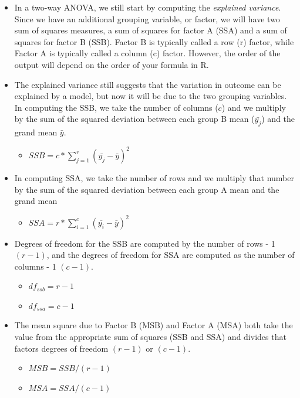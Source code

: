 \documentclass[
  letterpaper,
  DIV=11,
  numbers=noendperiod]{scrreprt}
\providecommand{\tightlist}{%
  \setlength{\itemsep}{0pt}\setlength{\parskip}{0pt}}\usepackage{longtable,booktabs,array}
\begin{document}
\begin{itemize}
\item
  In a two-way ANOVA, we still start by computing the \emph{explained
  variance}. Since we have an additional grouping variable, or factor,
  we will have two sum of squares measures, a sum of squares for factor
  A (SSA) and a sum of squares for factor B (SSB). Factor B is typically
  called a row (r) factor, while Factor A is typically called a column
  (c) factor. However, the order of the output will depend on the order
  of your formula in R.
\item
  The explained variance still suggests that the variation in outcome
  can be explained by a model, but now it will be due to the two
  grouping variables. In computing the SSB, we take the number of
  columns (\(c\)) and we multiply by the sum of the squared deviation
  between each group B mean (\(\bar{y_j}\)) and the grand mean
  \(\bar{y}\).

  \begin{itemize}
  \tightlist
  \item
    \(SSB = c*\sum^r_{j=1}{(\bar{y_j}-\bar{y}) ^2}\)
  \end{itemize}
\item
  In computing SSA, we take the number of rows and we multiply that
  number by the sum of the squared deviation between each group A mean
  and the grand mean

  \begin{itemize}
  \tightlist
  \item
    \(SSA =r*\sum^c_{i=1}{(\bar{y_i}-\bar{y}) ^2}\)
  \end{itemize}
\item
  Degrees of freedom for the SSB are computed by the number of rows - 1
  \((r-1)\), and the degrees of freedom for SSA are computed as the
  number of columns - 1 \((c-1)\).

  \begin{itemize}
  \tightlist
  \item
    \(df_{ssb} = r-1\)
  \item
    \(df_{ssa} = c-1\)
  \end{itemize}
\item
  The mean square due to Factor B (MSB) and Factor A (MSA) both take the
  value from the appropriate sum of squares (SSB and SSA) and divides
  that factors degrees of freedom \((r-1)\) or \((c-1)\).

  \begin{itemize}
  \tightlist
  \item
    \(MSB = SSB/(r-1)\)
  \item
    \(MSA = SSA/(c-1)\)
  \end{itemize}
\end{itemize}
\end{document}
